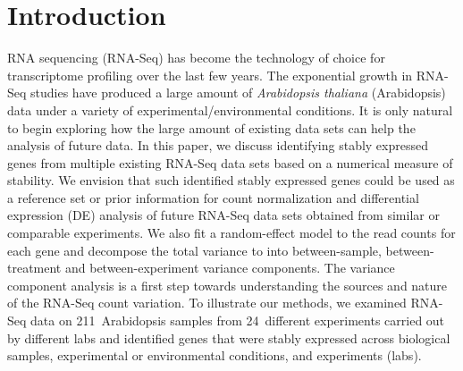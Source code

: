 \documentclass[letterpaper,12pt]{article}
\newcommand{\howmanySamples}{211~}
\newcommand{\howmanylab}{24~}
\begin{document}

\section{Introduction}\label{section:Introduction}

RNA sequencing (RNA-Seq) has become the technology of choice for transcriptome
profiling over the last few years. The exponential growth in RNA-Seq studies have
produced a large amount of \textit{Arabidopsis thaliana} (Arabidopsis) data under a variety of experimental/environmental conditions.  It is only natural to begin exploring
how the large amount of existing data sets can help the analysis of future
data.  In this paper, we discuss identifying stably expressed genes from
multiple existing RNA-Seq data sets based on a numerical measure of stability.
We envision that such identified stably expressed genes could be used as a
reference set or prior information for count normalization and differential
expression (DE) analysis of future RNA-Seq data sets obtained from similar or
comparable experiments.  We also fit a random-effect model to the read counts
for each gene and decompose the total variance to into between-sample,
between-treatment and between-experiment variance components. The variance component
analysis is a first step towards understanding the sources and nature of the
RNA-Seq count variation.  To illustrate our methods, we examined RNA-Seq data
on \howmanySamples Arabidopsis  samples from \howmanylab different experiments carried out by
different labs and identified genes that were stably expressed across
biological samples, experimental or environmental conditions, and experiments
(labs).  
\end{document}
